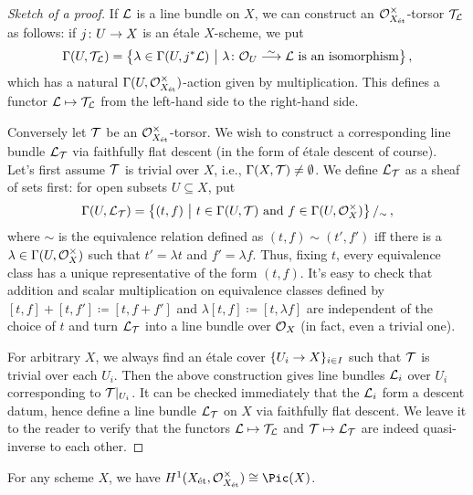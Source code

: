 \documentclass[a4paper, 10pt, oneside, DIV=9, chapterprefix=true, numbers=enddot, bibliography=totoc]{scrbook}
\begin{document}
\begin{proof}[Sketch of a proof]
	If $\mathcal{L}$ is a line bundle on $X$, we can construct an $\mathcal{O}_{X_{\mathrm{\acute{e}t}}}^\times$-torsor $\mathcal{T}_{\mathcal{L}}$ as follows: if $j\colon U\morphism X$ is an étale $X$-scheme, we put
	\begin{equation*}
		\Global(U,\Tt_\Ll)=\big\{\lambda\in \Global(U,j^*\Ll)\ \big|\ \lambda\colon \Oo_U\isomorphism \Ll\text{ is an isomorphism}\big\}\,,
	\end{equation*}
	which has a natural $\operatorname{\Gamma}(U,\mathcal{O}_{X_{\mathrm{\acute{e}t}}}^\times)$-action given by multiplication. This defines a functor $\mathcal{L}\mapsto \mathcal{T}_{\mathcal{L}}$ from the left-hand side to the right-hand side.
	
	Conversely let $\mathcal{T}$ be an $\mathcal{O}_{X_{\mathrm{\acute{e}t}}}^\times$-torsor. We wish to construct a corresponding line bundle $\mathcal{L}_{\mathcal{T}}$ via faithfully flat descent (in the form of étale descent of course). Let's first assume $\mathcal{T}$ is trivial over $X$, i.e., $\operatorname{\Gamma}(X,\mathcal{T})\neq \emptyset$. We define $\mathcal{L}_{\mathcal{T}}$ as a sheaf of sets first: for open subsets $U\subseteq X$, put
	\begin{equation*}
		\operatorname{\Gamma}(U,\mathcal{L}_{\mathcal{T}})=\left\{(t,f)\ \middle|\  t\in \operatorname{\Gamma}(U,\mathcal{T})\text{ and }f\in\operatorname{\Gamma}(U,\mathcal{O}_X^\times)\right\}/_\sim\,,
	\end{equation*}
	where $\sim$ is the equivalence relation defined as $(t,f)\sim (t',f')$ iff there is a $\lambda\in \operatorname{\Gamma}(U,\mathcal{O}_X^\times)$ such that $t'=\lambda t$ and $f'=\lambda f$. Thus, fixing $t$, every equivalence class has a unique representative of the form $(t,f)$. It's easy to check that addition and scalar multiplication on equivalence classes defined by $[t,f]+[t,f']\coloneqq [t,f+f']$ and $\lambda[t,f]\coloneqq [t,\lambda f]$ are independent of the choice of $t$ and turn $\mathcal{L}_{\mathcal{T}}$ into a line bundle over $\mathcal{O}_X$ (in fact, even a trivial one).
	
	For arbitrary $X$, we always find an étale cover $\{U_i\morphism X\}_{i\in I}$ such that $\mathcal{T}$ is trivial over each $U_i$. Then the above construction gives line bundles $\mathcal{L}_i$ over $U_i$ corresponding to $\mathcal{T}|_{U_i}$. It can be checked immediately that the $\mathcal{L}_i$ form a descent datum, hence define a line bundle $\mathcal{L}_{\mathcal{T}}$ on $X$ via faithfully flat descent. We leave it to the reader to verify that the functors $\mathcal{L}\mapsto \mathcal{T}_{\mathcal{L}}$ and $\mathcal{T}\mapsto \mathcal{L}_{\mathcal{T}}$ are indeed quasi-inverse to each other.
\end{proof}
\begin{cor}\label{cor:H1Pic}
	For any scheme $X$, we have $H^1(X_\et,\Oo_{X_\et}^\times)\cong \Pic(X)$.
\end{cor}
\end{document}
